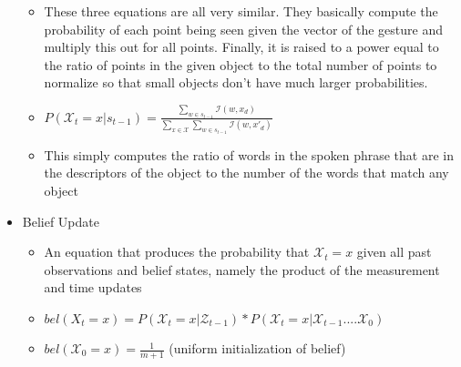 \documentclass[12pt,letterpaper]{article}
\begin{document}
\begin{itemize}
\begin{itemize}
	\item{These three equations are all very similar. They basically compute the probability of each point being seen given the vector of the gesture and multiply this out for all points. Finally, it is raised to a power equal to the ratio of points in the given object to the total number of points to normalize so that small objects don't have much larger probabilities.}
	\item{$P(\mathcal{X}_t=x|s_{t-1}) = \frac{\displaystyle\sum_{w\in s_{t-1}} \mathcal{I}(w, x_d)}{\displaystyle\sum_{x \in \mathcal{X}}\sum_{w\in s_{t-1}} \mathcal{I}(w, x'_d)}$}
	\item{This simply computes the ratio of words in the spoken phrase that are in the descriptors of the object to the number of the words that match any object}
	\end{itemize}
\item{Belief Update}
	\begin{itemize}
	\item{An equation that produces the probability that $\mathcal{X}_t = x$ given all past observations and belief states, namely the product of the measurement and time updates}
	\item{$bel(X_t = x) = P(\mathcal{X}_t=x | \mathcal{Z}_{t-1})*P(\mathcal{X}_t = x | \mathcal{X}_{t-1} .... \mathcal{X}_0)$}
	\item{$bel(\mathcal{X}_0 = x) =  \frac{1}{m+1}$ (uniform initialization of belief)}
	\end{itemize}
\end{itemize}
\end{document}
